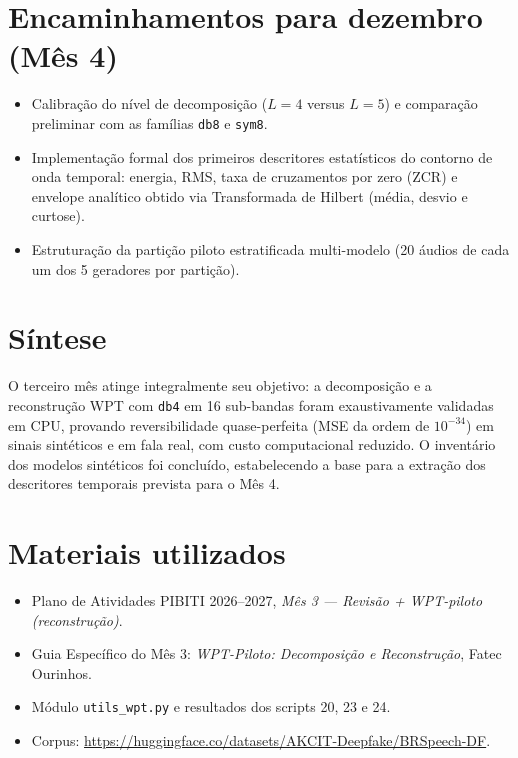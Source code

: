 \documentclass[11pt,a4paper]{article}
\begin{document}
\section{Encaminhamentos para dezembro (Mês 4)}
\begin{itemize}
\item Calibração do nível de decomposição ($L=4$ versus $L=5$) e comparação preliminar com as famílias \texttt{db8} e \texttt{sym8}.
\item Implementação formal dos primeiros descritores estatísticos do contorno de onda temporal: energia, RMS, taxa de cruzamentos por zero (ZCR) e envelope analítico obtido via Transformada de Hilbert (média, desvio e curtose).
\item Estruturação da partição piloto estratificada multi-modelo (20 áudios de cada um dos 5 geradores por partição).
\end{itemize}

\section{Síntese}
O terceiro mês atinge integralmente seu objetivo: a decomposição e a reconstrução WPT com \texttt{db4} em 16 sub-bandas foram exaustivamente validadas em CPU, provando reversibilidade quase-perfeita (MSE da ordem de $10^{-34}$) em sinais sintéticos e em fala real, com custo computacional reduzido. O inventário dos modelos sintéticos foi concluído, estabelecendo a base para a extração dos descritores temporais prevista para o Mês 4.

\section*{Materiais utilizados}
\begin{itemize}
\item Plano de Atividades PIBITI 2026--2027, \emph{Mês 3 --- Revisão + WPT-piloto (reconstrução)}.
\item Guia Específico do Mês 3: \emph{WPT-Piloto: Decomposição e Reconstrução}, Fatec Ourinhos.
\item Módulo \texttt{utils\_wpt.py} e resultados dos scripts 20, 23 e 24.
\item Corpus: \url{https://huggingface.co/datasets/AKCIT-Deepfake/BRSpeech-DF}.
\end{itemize}
\end{document}
